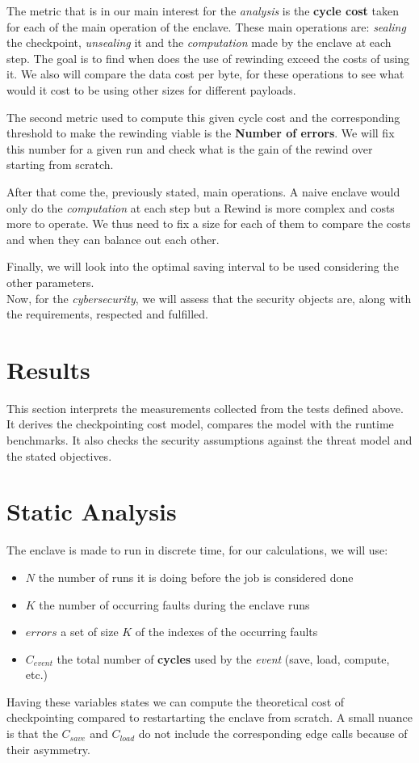 \documentclass[11pt,a4paper]{report}
\begin{document}
The metric that is in our main interest for the \textit{analysis} is the \textbf{cycle cost} taken for each of the main operation of the enclave.
These main operations are: \textit{sealing} the checkpoint, \textit{unsealing} it and the \textit{computation} made by the enclave at each step.
The goal is to find when does the use of rewinding exceed the costs of using it. 
We also will compare the data cost per byte, for these operations to see what would it cost to be using other sizes for different payloads.

The second metric used to compute this given cycle cost and the corresponding threshold to make the rewinding viable is the \textbf{Number of errors}.
We will fix this number for a given run and check what is the gain of the rewind over starting from scratch.

After that come the, previously stated, main operations. 
A naive enclave would only do the \textit{computation} at each step but a Rewind is more complex and costs more to operate.
We thus need to fix a size for each of them to compare the costs and when they can balance out each other. 

Finally, we will look into the optimal saving interval to be used considering the other parameters.
\\

Now, for the \textit{cybersecurity}, we will assess that the security objects are, along with the requirements, respected and fulfilled.


\section{Results}
This section interprets the measurements collected from the tests defined above.
It derives the checkpointing cost model, compares the model with the runtime benchmarks.
It also checks the security assumptions against the threat model and the stated objectives.
\\

\section{Static Analysis}
The enclave is made to run in discrete time, for our calculations, we will use:
\begin{itemize}
    \item $N$ the number of runs it is doing before the job is considered done
    \item $K$ the number of occurring faults during the enclave runs
    \item $errors$ a set of size $K$ of the indexes of the occurring faults
    \item $C_{event}$ the total number of \textbf{cycles} used by the \textit{event} (save, load, compute, etc.) 
\end{itemize}
Having these variables states we can compute the theoretical cost of checkpointing compared to restartarting the enclave from scratch.
A small nuance is that the $C_{save}$ and $C_{load}$ do not include the corresponding edge calls because of their asymmetry.
\end{document}
